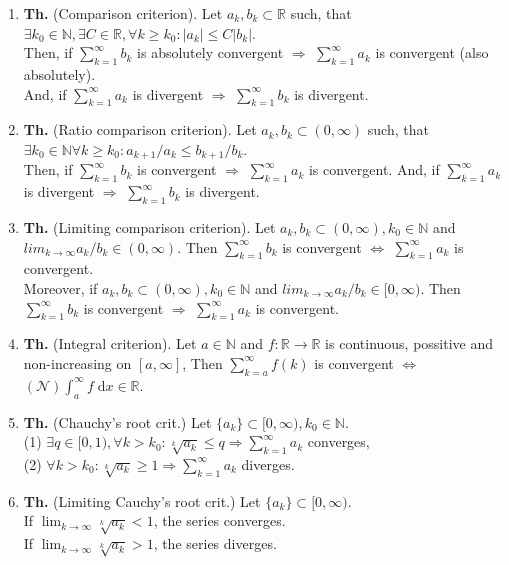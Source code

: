 \documentclass{article}
\newcommand{\<}{\left<}
\renewcommand{\>}{\right>}
\renewcommand{\d}{\;\text{d}}
\newcommand{\N}{\mathbb{N}}
\newcommand{\R}{\mathbb{R}}
\newcommand{\theor}{\textbf{Th. }}
\begin{document}
\begin{multicols}{3}
\begin{enumerate}[itemsep=2pt, topsep=2pt, partopsep=2pt, parsep=2pt]

        \item \theor (Comparison criterion). Let $a_k,b_k\subset\R$ such, that $\exists k_0\in\N,\exists C\in\R,\forall k\geq k_0:|a_k|\leq C|b_k|$.\\Then, if $\sum_{k=1}^\infty b_k$ is absolutely convergent $\Rightarrow$ $\sum_{k=1}^\infty a_k$ is convergent (also absolutely).\\
        And, if $\sum_{k=1}^\infty a_k$ is divergent $\Rightarrow$ $\sum_{k=1}^\infty b_k$ is divergent.
        \item \theor (Ratio comparison criterion). Let $a_k,b_k\subset(0,\infty)$ such, that $\exists k_0\in\N\forall k\geq k_0:a_{k+1}/a_k\leq b_{k+1}/b_k$.\\Then, if $\sum_{k=1}^\infty b_k$ is convergent $\Rightarrow$ $\sum_{k=1}^\infty a_k$ is convergent. And, if $\sum_{k=1}^\infty a_k$ is divergent $\Rightarrow$ $\sum_{k=1}^\infty b_k$ is divergent.
        \item \theor (Limiting comparison criterion). Let $a_k,b_k\subset(0,\infty),k_0\in\N$ and $lim_{k\to\infty}a_k/b_k\in(0,\infty)$. Then $\sum_{k=1}^\infty b_k$ is convergent $\Longleftrightarrow$ $\sum_{k=1}^\infty a_k$ is convergent. \\
        Moreover, if $a_k,b_k\subset(0,\infty),k_0\in\N$ and $lim_{k\to\infty}a_k/b_k\in[0,\infty)$. Then $\sum_{k=1}^\infty b_k$ is convergent $\Longrightarrow$ $\sum_{k=1}^\infty a_k$ is convergent.
        \item \theor (Integral criterion). Let $a\in\N$ and $f:\R\to\R$ is continuous, possitive and non-increasing on $[a,\infty]$, Then $\sum_{k=a}^\infty f(k)$ is convergent $\Longleftrightarrow$ $(\mathcal N)\int_a^\infty f\d x\in\R$.
        \item \theor (Chauchy's root crit.) Let $\{a_k\}\subset[0,\infty),k_0\in\N$.\\
        (1) $\exists q\in[0,1),\forall k>k_0:\sqrt[k]{a_k}\leq q\Rightarrow\sum_{k=1}^\infty a_k$ converges,\\
        (2) $\forall k>k_0:\sqrt[k]{a_k}\geq 1\Longrightarrow\sum_{k=1}^\infty a_k$ diverges.
        \item \theor (Limiting Cauchy's root crit.) Let $\{a_k\}\subset[0,\infty)$.\\
        If $\lim_{k\to\infty}\sqrt[k]{a_k}<1$, the series converges.\\If $\lim_{k\to\infty}\sqrt[k]{a_k}>1$,  the series diverges.

\end{enumerate}
\end{multicols}
\end{document}
